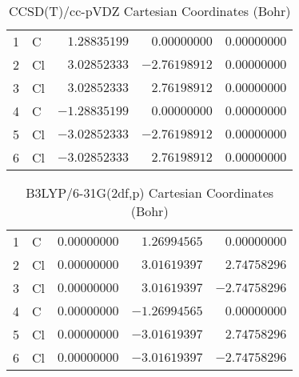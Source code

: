 \documentclass[10pt,oneside]{article}
\begin{document}
\begin{table}[h!]
\centering
\caption{CCSD(T)/cc-pVDZ Cartesian Coordinates (Bohr)}
\begin{tabular}{llrrr}
1  & C  & $ 1.28835199$ & $ 0.00000000$ & $ 0.00000000$ \\
2  & Cl & $ 3.02852333$ & $-2.76198912$ & $ 0.00000000$ \\
3  & Cl & $ 3.02852333$ & $ 2.76198912$ & $ 0.00000000$ \\
4  & C  & $-1.28835199$ & $ 0.00000000$ & $ 0.00000000$ \\
5  & Cl & $-3.02852333$ & $-2.76198912$ & $ 0.00000000$ \\
6  & Cl & $-3.02852333$ & $ 2.76198912$ & $ 0.00000000$ \\
\end{tabular}
\end{table}

\begin{table}[h!]
\centering
\caption{B3LYP/6-31G(2df,p) Cartesian Coordinates (Bohr)}
\begin{tabular}{llrrr}
1  & C  & $ 0.00000000$ & $ 1.26994565$ & $ 0.00000000$ \\
2  & Cl & $ 0.00000000$ & $ 3.01619397$ & $ 2.74758296$ \\
3  & Cl & $ 0.00000000$ & $ 3.01619397$ & $-2.74758296$ \\
4  & C  & $ 0.00000000$ & $-1.26994565$ & $ 0.00000000$ \\
5  & Cl & $ 0.00000000$ & $-3.01619397$ & $ 2.74758296$ \\
6  & Cl & $ 0.00000000$ & $-3.01619397$ & $-2.74758296$ \\
\end{tabular}
\end{table}

\clearpage
\end{document}
